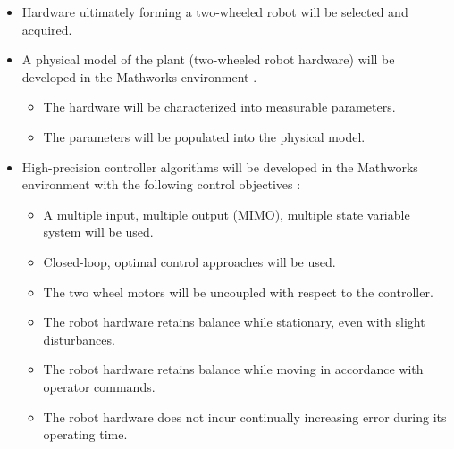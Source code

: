 \documentclass[crop=false,float=true,class=scrartcl]{standalone}
\begin{document}
\begin{itemize} 

\item Hardware ultimately forming a two-wheeled robot will be selected and acquired.

\item A physical model of the plant (two-wheeled robot hardware) will be developed in the Mathworks environment
      \cite{REF:Textbook:1995-Vaccaro,
            REF:Thesis:Masters:2012-Peltier,       %
            REF:Conference:2010-Jones,             %
            REF:Thesis:Undergraduate:2011-Bageant, %
            REF:Thesis:Masters:2014-daSilva,
            REF:Conference:2015-Gong}.

  \begin{itemize}
  \item The hardware will be characterized into measurable parameters.
  \item The parameters will be populated into the physical model.
  \end{itemize}

\item High-precision controller algorithms will be developed in the Mathworks environment with the following control objectives
      \cite{REF:Textbook:1995-Lewis,               %
            REF:Textbook:2001-DeLuca,              %
            REF:Conference:2014-Jamil,             %
            REF:Thesis:Masters:2014-daSilva,
            REF:Conference:2015-Gong}:

  \begin{itemize}
  \item A multiple input, multiple output (MIMO), multiple state variable system will be used.
  \item Closed-loop, optimal control approaches will be used.
  \item The two wheel motors will be uncoupled with respect to the controller.
  \item The robot hardware retains balance while stationary, even with slight disturbances.
  \item The robot hardware retains balance while moving in accordance with operator commands.
  \item The robot hardware does not incur continually increasing error during its operating time.
  \end{itemize}


\end{itemize}
\end{document}
